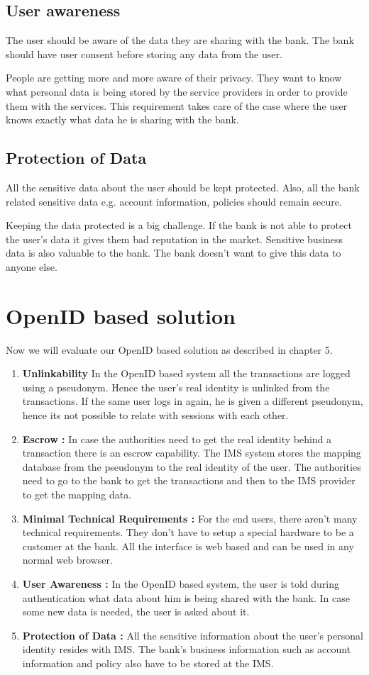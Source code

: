 \subsection{User awareness}
The user should be aware of the data they are sharing with the bank. The bank should have user consent before storing any data from the user.

People are getting more and more aware of their privacy. They want to know what personal data is being stored by the service providers in order to provide them with the services. This requirement takes care of the case where the user knows exactly what data he is sharing with the bank.
\subsection{Protection of Data}
All the sensitive data about the user should be kept protected. Also, all the bank related sensitive data e.g. account information, policies should remain secure.

Keeping the data protected is a big challenge. If the bank is not able to protect the user's data it gives them bad reputation in the market. Sensitive business data is also valuable to the bank. The bank doesn't want to give this data to anyone else.

\section{OpenID based solution}
Now we will evaluate our OpenID based solution as described in chapter 5. 
\begin{enumerate}
	\item{\textbf{Unlinkability}}
	In the OpenID based system all the transactions are logged using a pseudonym. Hence the user's real identity is unlinked from the transactions. If the same user logs in again, he is given a different pseudonym, hence its not possible to relate with sessions with each other.
	\item{\textbf{Escrow :}}
	In case the authorities need to get the real identity behind a transaction there is an escrow capability. The IMS system stores the mapping database from the pseudonym to the real identity of the user. The authorities need to go to the bank to get the transactions and then to the IMS provider to get the mapping data.
	\item{\textbf{Minimal Technical Requirements :}}
	For the end users, there aren't many technical requirements. They don't have to setup a special hardware to be a customer at the bank. All the interface is web based and can be used in any normal web browser. 
	\item{\textbf{User Awareness :}}
	In the OpenID based system, the user is told during authentication what data about him is being shared with the bank. In case some new data is needed, the user is asked about it.
	\item{\textbf{Protection of Data :}}
	All the sensitive information about the user's personal identity resides with IMS. The bank's business information such as account information and policy also have to be stored at the IMS.
\end{enumerate}

